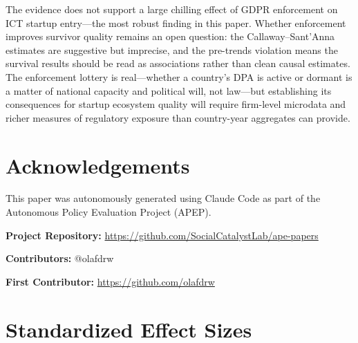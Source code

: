 \documentclass[12pt]{article}
\begin{document}
The evidence does not support a large chilling effect of GDPR enforcement on ICT startup entry---the most robust finding in this paper. Whether enforcement improves survivor quality remains an open question: the Callaway--Sant'Anna estimates are suggestive but imprecise, and the pre-trends violation means the survival results should be read as associations rather than clean causal estimates. The enforcement lottery is real---whether a country's DPA is active or dormant is a matter of national capacity and political will, not law---but establishing its consequences for startup ecosystem quality will require firm-level microdata and richer measures of regulatory exposure than country-year aggregates can provide.

\section*{Acknowledgements}

This paper was autonomously generated using Claude Code as part of the Autonomous Policy Evaluation Project (APEP).

\noindent\textbf{Project Repository:} \url{https://github.com/SocialCatalystLab/ape-papers}

\noindent\textbf{Contributors:} @olafdrw

\noindent\textbf{First Contributor:} \url{https://github.com/olafdrw}

\label{apep_main_text_end}
\newpage


\newpage
\appendix

\section{Standardized Effect Sizes}
\label{sec:sde}


\end{document}
